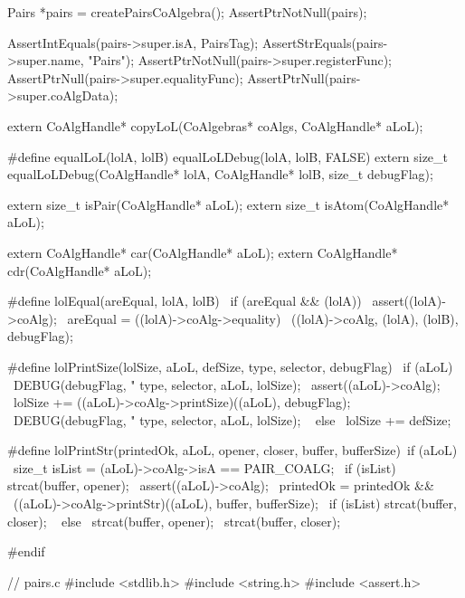 
\startCTest
  Pairs *pairs = createPairsCoAlgebra();
  AssertPtrNotNull(pairs);
  
  AssertIntEquals(pairs->super.isA, PairsTag);
  AssertStrEquals(pairs->super.name, "Pairs");
  AssertPtrNotNull(pairs->super.registerFunc);
  AssertPtrNull(pairs->super.equalityFunc);
  AssertPtrNull(pairs->super.coAlgData);  
\stopCTest
\stopTestCase
\stopTestSuite


\starttyping



extern CoAlgHandle* copyLoL(CoAlgebras* coAlgs, CoAlgHandle* aLoL);

#define equalLoL(lolA, lolB) equalLoLDebug(lolA, lolB, FALSE)
extern size_t equalLoLDebug(CoAlgHandle* lolA, CoAlgHandle* lolB, size_t debugFlag);

extern size_t isPair(CoAlgHandle* aLoL);
extern size_t isAtom(CoAlgHandle* aLoL);

extern CoAlgHandle* car(CoAlgHandle* aLoL);
extern CoAlgHandle* cdr(CoAlgHandle* aLoL);

#define lolEqual(areEqual, lolA, lolB)		  \
  if (areEqual && (lolA)) {			  \
    assert((lolA)->coAlg);			  \
    areEqual = ((lolA)->coAlg->equality)	  \
      ((lolA)->coAlg, (lolA), (lolB), debugFlag); \
  }

#define lolPrintSize(lolSize, aLoL, defSize, type, selector, debugFlag)	\
  if (aLoL) {								\
    DEBUG(debugFlag, "%
          type, selector, aLoL, lolSize);				\
    assert((aLoL)->coAlg);						\
    lolSize += ((aLoL)->coAlg->printSize)((aLoL), debugFlag);		\
    DEBUG(debugFlag, "%
          type, selector, aLoL, lolSize);				\
  } else {								\
    lolSize += defSize;							\
  }

#define lolPrintStr(printedOk, aLoL, opener, closer, buffer, bufferSize)\
  if (aLoL) {								\
    size_t isList = (aLoL)->coAlg->isA == PAIR_COALG;			\
    if (isList) strcat(buffer, opener);					\
    assert((aLoL)->coAlg);						\
    printedOk = printedOk && 						\
      ((aLoL)->coAlg->printStr)((aLoL), buffer, bufferSize);		\
    if (isList) strcat(buffer, closer);					\
  } else {								\
    strcat(buffer, opener);						\
    strcat(buffer, closer);						\
  }

#endif
\stoptyping

\starttyping
// pairs.c
#include <stdlib.h>
#include <string.h>
#include <assert.h>

